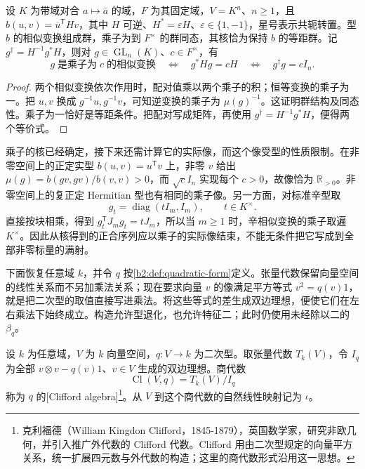 \begin{proposition}\label{b2:prop:similitude-multiplier}
	设 \(K\) 为带域对合 \(a\mapsto\bar a\) 的域，\(F\) 为其固定域，\(V=K^n\)、\(n\ge1\)，且 \(b(u,v)=\overline u^{\mathsf T}Hv\)，其中 \(H\) 可逆、\(H^*=\varepsilon H\)、\(\varepsilon\in\{1,-1\}\)，星号表示共轭转置。型 \(b\) 的相似变换组成群，乘子为到 \(F^\times\) 的群同态，其核恰为保持 \(b\) 的等距群。记 \(g^\dagger=H^{-1}g^*H\)，则对 \(g\in\operatorname{GL}_n(K)\)、\(c\in F^\times\)，有
	\[
		g\;\text{是乘子为}\;c\;\text{的相似变换} \quad\Longleftrightarrow\quad g^*Hg=cH \quad\Longleftrightarrow\quad g^\dagger g=cI_n.
	\]
\end{proposition}
\begin{proof}
	两个相似变换依次作用时，配对值乘以两个乘子的积；恒等变换的乘子为一。把 \(u,v\) 换成 \(g^{-1}u,g^{-1}v\)，可知逆变换的乘子为 \(\mu(g)^{-1}\)。这证明群结构及同态性。乘子为一恰好是等距条件。把配对写成矩阵，再使用 \(g^\dagger=H^{-1}g^*H\)，便得两个等价式。
\end{proof}

乘子的核已经确定，接下来还需计算它的实际像，而这个像受型的性质限制。在非零空间上的正定实型 \(b(u,v)=u^{\mathsf T}v\) 上，非零 \(v\) 给出 \(\mu(g)=b(gv,gv)/b(v,v)>0\)，而 \(\sqrt c I_n\) 实现每个 \(c>0\)，故像恰为 \(\mathbb R_{>0}\)。非零空间上的复正定 Hermitian 型也有相同的乘子像。另一方面，对标准辛型取
\[
	g_t=\operatorname{diag}(tI_m,I_m),\qquad t\in K^\times.
\]
直接按块相乘，得到 \(g_t^{\mathsf T}J_mg_t=tJ_m\)，所以当 \(m\ge1\) 时，辛相似变换的乘子取遍 \(K^\times\)。因此从核得到的正合序列应以乘子的实际像结束，不能无条件把它写成到全部非零标量的满射。


下面恢复任意域 \(k\)，并令 \(q\) 按\cref{b2:def:quadratic-form}定义。张量代数保留向量空间的线性关系而不另加乘法关系；现在要求向量 \(v\) 的像满足平方等式 \(v^2=q(v)1\)，就是把二次型的取值直接写进乘法。将这些等式的差生成双边理想，便使它们在左右乘法下始终成立。构造允许型退化，也允许特征二；此时仍使用未经除以二的 \(\beta_q\)。

\begin{definition}\label{b2:def:clifford-algebra}
	设 \(k\) 为任意域，\(V\) 为 \(k\) 向量空间，\(q:V\to k\) 为二次型。取张量代数 \(T_k(V)\)，令 \(I_q\) 为全部 \(v\otimes v-q(v)1\)、\(v\in V\) 生成的双边理想。商代数
	\[
		\operatorname{Cl}(V,q)=T_k(V)/I_q
	\]
	称为 \(q\) 的[Clifford algebra]\footnote{克利福德（William Kingdon Clifford，1845-1879），英国数学家，研究非欧几何，并引入推广外代数的 Clifford 代数。Clifford 用由二次型规定的向量平方关系，统一扩展四元数与外代数的构造；这里的商代数形式沿用这一思想。}。从 \(V\) 到这个商代数的自然线性映射记为 \(\iota\)。
\end{definition}

